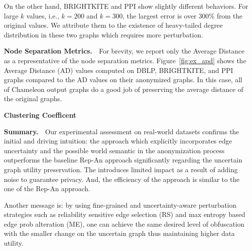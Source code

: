 On the other hand, BRIGHTKITE and PPI show slightly different behaviors. For large $k$ values, i.e., $k=200$ and $k=300$, the largest error is over 300\% from the original values. We attribute them to the existence of heavy-tailed degree distribution in these two graphs which requires more perturbation. 


\textbf{Node Separation Metrics.}~~For brevity, we report only the Average Distance as a representative of the node separation metrics. Figure~\ref{fig:ex_apd} shows the Average Distance (AD) values computed on DBLP, BRIGHTKITE, and PPI graphs compared to the AD values on their anonymized graphs. In this case, all of Chameleon output graphs do a good job of preserving the average distance of the original graphs. 



\textbf{Clustering Coefficent}


\textbf{Summary.}~~Our experimental assessment on real-world datasets confirms the initial and driving intuition: the {\SysNameNS} approach which explicitly incorporates edge uncertainty and the possible world semantic in the anonymization process outperforms the baseline \textsf{Rep-An} approach significantly regarding the uncertain graph utility preservation. The {\SysNameNS} introduces limited impact as a result of adding noise to guarantee privacy. And, the efficiency of the {\SysNameNS} approach is similar to the one of the \textsf{Rep-An} approach. 

Another message is: by using fine-grained and uncertainty-aware perturbation strategies such as reliability sensitive edge selection (RS) and max entropy based edge prob alteration (ME), one can achieve the same desired level of obfuscation with the smaller change on the uncertain graph thus maintaining higher data utility. 




